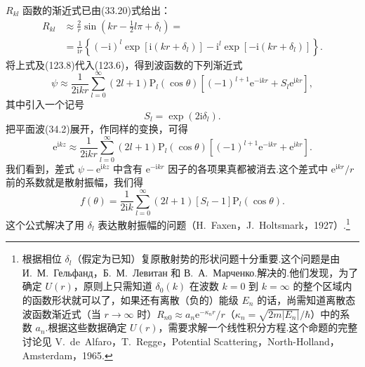 $R_{kl}$ 函数的渐近式已由(33.20)式给出：
\begin{equation*}
\begin{aligned}
  R_{kl}&\approx\frac{2}{r}\sin\left(kr-\frac{1}{2}l\pi+\delta_l\right)=\\
  &=\frac{1}{\mathrm{i}r}\left\{(-\mathrm{i})^l
  \exp\left[\mathrm{i}(kr+\delta_l)\right]
  -\mathrm{i}^l\exp\left[-\mathrm{i}(kr+\delta_l)\right]\right\}.
\end{aligned}
\end{equation*}
将上式及(123.8)代入(123.6)，得到波函数的下列渐近式
\begin{equation}
  \psi\approx\frac{1}{2\mathrm{i}kr}\sum_{l=0}^{\infty}(2l+1)
  \mathrm{P}_l(\cos\theta)\left[(-1)^{l+1}\mathrm{e}^{-\mathrm{i}kr}
  +S_l\mathrm{e}^{\mathrm{i}kr}\right],
\end{equation}
其中引入一个记号
\begin{equation}
  S_l=\exp(2\mathrm{i}\delta_l).
\end{equation}
把平面波(34.2)展开，作同样的变换，可得
\begin{equation*}
  \mathrm{e}^{\mathrm{i}kz}\approx\frac{1}{2\mathrm{i}kr}\sum_{l=0}^{\infty}(2l+1)
  \mathrm{P}_l(\cos\theta)\left[(-1)^{l+1}\mathrm{e}^{-\mathrm{i}kr}
  +\mathrm{e}^{\mathrm{i}kr}\right].
\end{equation*}
我们看到，差式 $\psi-\mathrm{e}^{\mathrm{i}kz}$ 中含有 $\mathrm{e}^{-\mathrm{i}kr}$ 因子的各项果真都被消去.这个差式中 $\mathrm{e}^{\mathrm{i}kr}/r$ 前的系数就是散射振幅，我们得
\begin{equation}
  f(\theta)=\frac{1}{2\mathrm{i}k}\sum_{l=0}^{\infty}(2l+1)
  \left[S_l-1\right]\mathrm{P}_l(\cos\theta).
\end{equation}
这个公式解决了用 $\delta_l$ 表达散射振幅的问题（H.~Faxen，J.~Holtsmark，1927）.\footnote{根据相位 $\delta_l$（假定为已知）复原散射势的形状问题十分重要.这个问题是由 И.~М.~Гельфанд，Б.~М.~Левитан 和 В.~А.~Марченко.解决的.他们发现，为了确定 $U(r)$，原则上只需知道 $\delta_0(k)$ 在波数 $k=0$ 到 $k=\infty$ 的整个区域内的函数形状就可以了，如果还有离散（负的）能级 $E_n$ 的话，尚需知道离散态波函数渐近式（当 $r\to\infty$ 时）$R_{n0}\approx a_n\mathrm{e}^{-\kappa_n r}/r$（$\kappa_n=\sqrt{2m|E_n|}/\hbar$）中的系数 $a_n$.根据这些数据确定 $U(r)$，需要求解一个线性积分方程.这个命题的完整讨论见 V.~de~Alfaro，T.~Regge，Potential Scattering，North-Holland，Amsterdam，1965.}

